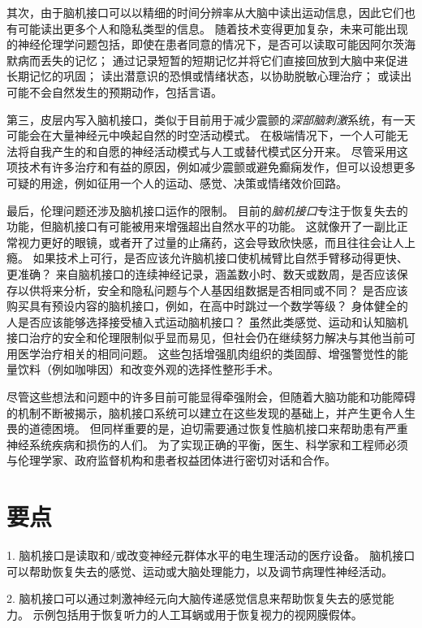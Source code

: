 其次，由于脑机接口可以以精细的时间分辨率从大脑中读出运动信息，因此它们也有可能读出更多个人和隐私类型的信息。
随着技术变得更加复杂，未来可能出现的神经伦理学问题包括，即使在患者同意的情况下，是否可以读取可能因阿尔茨海默病而丢失的记忆；
通过记录短暂的短期记忆并将它们直接回放到大脑中来促进长期记忆的巩固；
读出潜意识的恐惧或情绪状态，以协助脱敏心理治疗；
或读出可能不会自然发生的预期动作，包括言语。


第三，皮层内写入脑机接口，类似于目前用于减少震颤的\textit{深部脑刺激}系统，有一天可能会在大量神经元中唤起自然的时空活动模式。
在极端情况下，一个人可能无法将自我产生的和自愿的神经活动模式与人工或替代模式区分开来。
尽管采用这项技术有许多治疗和有益的原因，例如减少震颤或避免癫痫发作，但可以设想更多可疑的用途，例如征用一个人的运动、感觉、决策或情绪效价回路。


最后，伦理问题还涉及脑机接口运作的限制。
目前的\textit{脑机接口}专注于恢复失去的功能，但脑机接口有可能被用来增强超出自然水平的功能。
这就像开了一副比正常视力更好的眼镜，或者开了过量的止痛药，这会导致欣快感，而且往往会让人上瘾。
如果技术上可行，是否应该允许脑机接口使机械臂比自然手臂移动得更快、更准确？
来自脑机接口的连续神经记录，涵盖数小时、数天或数周，是否应该保存以供将来分析，安全和隐私问题与个人基因组数据是否相同或不同？
是否应该购买具有预设内容的脑机接口，例如，在高中时跳过一个数学等级？
身体健全的人是否应该能够选择接受植入式运动脑机接口？ 
虽然此类感觉、运动和认知脑机接口治疗的安全和伦理限制似乎显而易见，但社会仍在继续努力解决与其他当前可用医学治疗相关的相同问题。
这些包括增强肌肉组织的类固醇、增强警觉性的能量饮料（例如咖啡因）和改变外观的选择性整形手术。


尽管这些想法和问题中的许多目前可能显得牵强附会，但随着大脑功能和功能障碍的机制不断被揭示，脑机接口系统可以建立在这些发现的基础上，并产生更令人生畏的道德困境。
但同样重要的是，迫切需要通过恢复性脑机接口来帮助患有严重神经系统疾病和损伤的人们。
为了实现正确的平衡，医生、科学家和工程师必须与伦理学家、政府监督机构和患者权益团体进行密切对话和合作。



\section{要点}

1. 脑机接口是读取和/或改变神经元群体水平的电生理活动的医疗设备。
脑机接口可以帮助恢复失去的感觉、运动或大脑处理能力，以及调节病理性神经活动。


2. 脑机接口可以通过刺激神经元向大脑传递感觉信息来帮助恢复失去的感觉能力。
示例包括用于恢复听力的人工耳蜗或用于恢复视力的视网膜假体。


